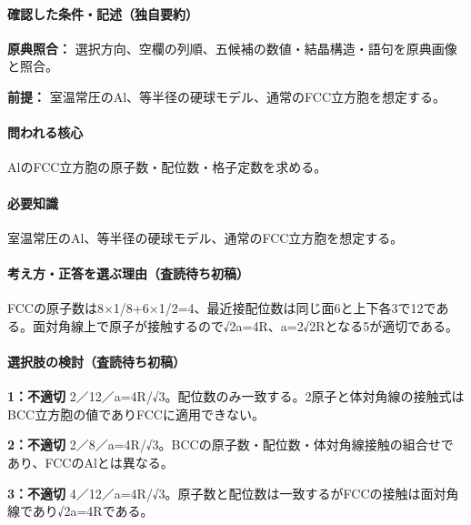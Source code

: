 \paragraph{確認した条件・記述（独自要約）}\mbox{}\par

\noindent\textbf{原典照合：} 選択方向、空欄の列順、五候補の数値・結晶構造・語句を原典画像と照合。\par

\noindent\textbf{前提：} 室温常圧のAl、等半径の硬球モデル、通常のFCC立方胞を想定する。\par

\paragraph{問われる核心} AlのFCC立方胞の原子数・配位数・格子定数を求める。

\paragraph{必要知識} 室温常圧のAl、等半径の硬球モデル、通常のFCC立方胞を想定する。

\paragraph{考え方・正答を選ぶ理由（査読待ち初稿）} FCCの原子数は8×1/8+6×1/2=\allowbreak{}4、最近接配位数は同じ面6と上下各3で12である。面対角線上で原子が接触するので√2a=\allowbreak{}4R、a=\allowbreak{}2√2Rとなる5が適切である。

\paragraph{選択肢の検討（査読待ち初稿）}\mbox{}\par

\noindent\textbf{1：不適切} 2／12／a=\allowbreak{}4R/√3。配位数のみ一致する。2原子と体対角線の接触式はBCC立方胞の値でありFCCに適用できない。\par

\noindent\textbf{2：不適切} 2／8／a=\allowbreak{}4R/√3。BCCの原子数・配位数・体対角線接触の組合せであり、FCCのAlとは異なる。\par

\noindent\textbf{3：不適切} 4／12／a=\allowbreak{}4R/√3。原子数と配位数は一致するがFCCの接触は面対角線であり√2a=\allowbreak{}4Rである。\par

